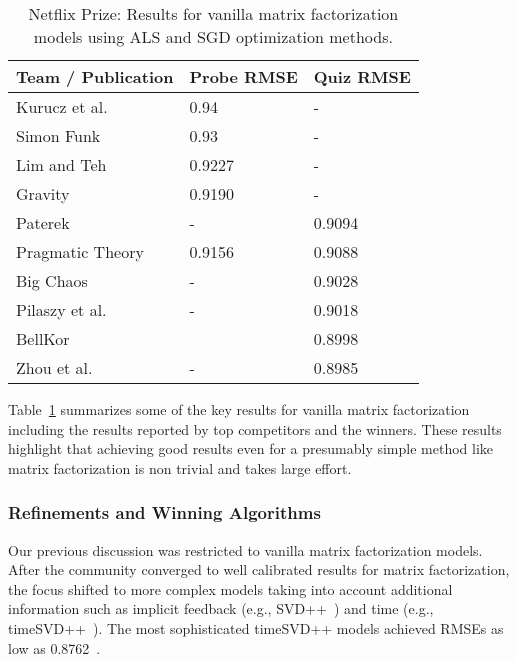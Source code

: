 \documentclass{article}
\newcommand\rmseNFprobefunksvd{0.93}
\newcommand\rmseNFtestpatarek{0.9094}
\newcommand\rmseNFprobePT{0.9156}
\newcommand\rmseNFtestPT{0.9088}
\newcommand\rmseNFtestbgSGD{0.9028}
\newcommand\rmseNFtestZhou{0.8985}
\newcommand\rmseNFprobeGravity{0.9190}
\newcommand\rmseNFtestPilaszy{0.9018}
\newcommand\rmseNFtestYehuda{0.8998}
\newcommand\rmseNFprobeKurucz{0.94}
\newcommand\rmseNFprobeLimMAP{0.9227}
\begin{document}
\begin{table}[t]
    \centering
    \begin{tabular}{lll} \\
    \hline
    Team / Publication & {Probe RMSE} & {Quiz RMSE}\\
    \hline
    Kurucz et al.~\cite{kurucz:kddcup07} & \rmseNFprobeKurucz & -  \\
    Simon Funk \cite{funksvd} & \rmseNFprobefunksvd &  - \\
    Lim and Teh~\cite{lim:kddcup07}          & \rmseNFprobeLimMAP & - \\
    Gravity~\cite{takacs:kddcup07}          & \rmseNFprobeGravity & - \\
    Paterek~\cite{paterek:kddcup07} & - & \rmseNFtestpatarek\\
    Pragmatic Theory~\cite{pt:grandprize} & \rmseNFprobePT & \rmseNFtestPT \\
    Big Chaos~\cite{bigchaos:grandprize} & - & \rmseNFtestbgSGD \\
    Pilaszy et al.~\cite{pilaszy:rs10}     & - & \rmseNFtestPilaszy \\
    BellKor~\cite{bell:progressprize07} & & \rmseNFtestYehuda \\
    Zhou et al.~\cite{zhou:aaim08} & - & \rmseNFtestZhou \\
    \bottomrule
    \end{tabular}
    \caption{Netflix Prize: Results for vanilla matrix factorization models using ALS and SGD optimization methods.}
    \label{tbl:netflix_mf}
\end{table}


Table~\ref{tbl:netflix_mf} summarizes some of the key results for vanilla matrix factorization including the results reported by top competitors and the winners.
These results highlight that achieving good results even for a presumably simple method like matrix factorization is non trivial and takes large effort.



\subsubsection{Refinements and Winning Algorithms}

Our previous discussion was restricted to vanilla matrix factorization models.
After the community converged to well calibrated results for matrix factorization, the focus shifted to more complex models taking into account additional information such as implicit feedback (e.g., SVD++~\cite{koren:kdd08}) and time (e.g., timeSVD++~\cite{koren:kdd09}).
The most sophisticated timeSVD++ models achieved RMSEs as low as 0.8762~\cite{koren:grandprize}.
\end{document}
